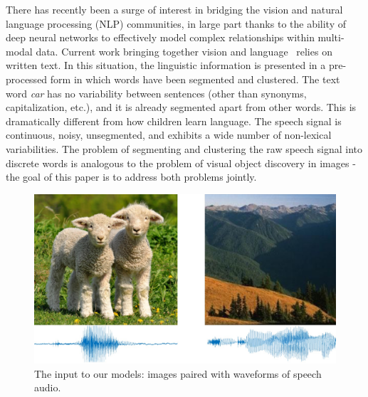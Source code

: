 There has recently been a surge of interest in bridging the vision and natural language processing (NLP) communities, in large part thanks to the ability of deep neural networks to effectively model complex relationships within multi-modal data. %
Current work  bringing together vision and language~\cite{karpathy_2015,vinyals_2015,fang_2015,xu_2015,densecap,antol_2015,malinowski_2014,malinowski_2015,gao_2015,ren_2015,guess_what,reed_2016} relies on written text. In this situation, the linguistic information is presented in a pre-processed form in which words have been segmented and clustered. The text word {\it car} has no variability between sentences (other than synonyms, capitalization, etc.), and it is already segmented apart from other words. This is dramatically different from how children learn language. The speech signal is continuous, noisy, unsegmented, and exhibits a wide number of non-lexical variabilities. The problem of segmenting and clustering the raw speech signal into discrete words is analogous to the problem of visual object discovery in images - the goal of this paper is to address both problems jointly. 

\begin{figure}
    \centering
    \includegraphics[width=0.9\linewidth]{figures/images_paper/lamb_hill_waveforms.jpg}
    \caption{The input to our models: images paired with waveforms of speech audio.}
    \label{fig:images_with_waveforms}
\end{figure}



